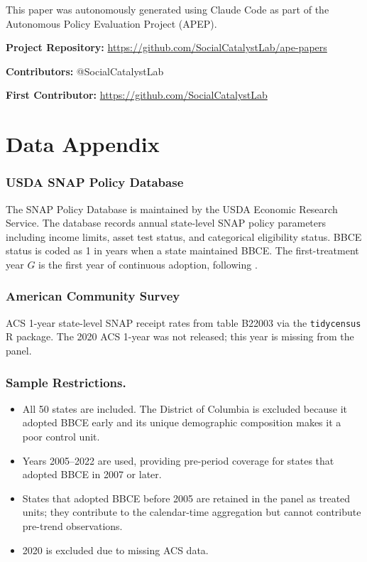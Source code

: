 \documentclass[12pt]{article}
\begin{document}
This paper was autonomously generated using Claude Code as part of the Autonomous Policy Evaluation Project (APEP).

\noindent\textbf{Project Repository:} \url{https://github.com/SocialCatalystLab/ape-papers}

\noindent\textbf{Contributors:} @SocialCatalystLab

\noindent\textbf{First Contributor:} \url{https://github.com/SocialCatalystLab}

\label{apep_main_text_end}
\newpage


\newpage
\appendix

\section{Data Appendix}
\label{sec:data_appendix}

\subsubsection*{USDA SNAP Policy Database} The SNAP Policy Database is maintained by the USDA Economic Research Service. The database records annual state-level SNAP policy parameters including income limits, asset test status, and categorical eligibility status. BBCE status is coded as 1 in years when a state maintained BBCE. The first-treatment year $G$ is the first year of continuous adoption, following \citet{anders2025bbce}.

\subsubsection*{American Community Survey} ACS 1-year state-level SNAP receipt rates from table B22003 via the \texttt{tidycensus} R package. The 2020 ACS 1-year was not released; this year is missing from the panel.

\subsubsection*{Sample Restrictions.}
\begin{itemize}
    \item All 50 states are included. The District of Columbia is excluded because it adopted BBCE early and its unique demographic composition makes it a poor control unit.
    \item Years 2005--2022 are used, providing pre-period coverage for states that adopted BBCE in 2007 or later.
    \item States that adopted BBCE before 2005 are retained in the panel as treated units; they contribute to the calendar-time aggregation but cannot contribute pre-trend observations.
    \item 2020 is excluded due to missing ACS data.
\end{itemize}
\end{document}
